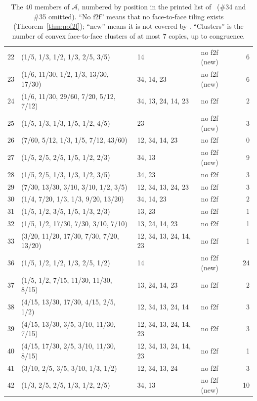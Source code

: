 \documentclass[11pt]{amsart}
\theoremstyle{definition}
\newcommand{\cA}{\mathscr{A}}
\begin{document}
\begin{table}[p]
\begin{tabular}{@{}rlllr@{}}
22 & (1/5, 1/3, 1/2, 1/3, 2/5, 3/5) & 14 & no f2f (new) & 6 \\
23 & (1/6, 11/30, 1/2, 1/3, 13/30, 17/30) & 34, 14, 23 & no f2f (new) & 6 \\
24 & (1/6, 11/30, 29/60, 7/20, 5/12, 7/12) & 34, 13, 24, 14, 23 & no f2f & 2 \\
25 & (1/5, 1/3, 1/3, 1/5, 1/2, 4/5) & 23 & no f2f (new) & 3 \\
26 & (7/60, 5/12, 1/3, 1/5, 7/12, 43/60) & 12, 34, 14, 23 & no f2f & 0 \\
27 & (1/5, 2/5, 2/5, 1/5, 1/2, 2/3) & 34, 13 & no f2f (new) & 9 \\
28 & (1/5, 2/5, 1/3, 1/3, 1/2, 3/5) & 34, 23 & no f2f & 3 \\
29 & (7/30, 13/30, 3/10, 3/10, 1/2, 3/5) & 12, 34, 13, 24, 23 & no f2f & 3 \\
30 & (1/4, 7/20, 1/3, 1/3, 9/20, 13/20) & 34, 14, 23 & no f2f & 2 \\
31 & (1/5, 1/2, 3/5, 1/5, 1/3, 2/3) & 13, 23 & no f2f & 1 \\
32 & (1/5, 1/2, 17/30, 7/30, 3/10, 7/10) & 13, 24, 14, 23 & no f2f & 1 \\
33 & (3/20, 11/20, 17/30, 7/30, 7/20, 13/20) & 12, 34, 13, 24, 14, 23 & no f2f & 1 \\
36 & (1/5, 1/2, 1/2, 1/3, 2/5, 1/2) & 14 & no f2f (new) & 24 \\
37 & (1/5, 1/2, 7/15, 11/30, 11/30, 8/15) & 13, 24, 14, 23 & no f2f & 2 \\
38 & (4/15, 13/30, 17/30, 4/15, 2/5, 1/2) & 12, 34, 13, 24, 14 & no f2f & 3 \\
39 & (4/15, 13/30, 3/5, 3/10, 11/30, 7/15) & 12, 34, 13, 24, 14, 23 & no f2f & 3 \\
40 & (4/15, 17/30, 2/5, 3/10, 11/30, 8/15) & 12, 34, 13, 24, 14, 23 & no f2f & 1 \\
41 & (3/10, 2/5, 3/5, 3/10, 1/3, 1/2) & 12, 34, 13, 24 & no f2f & 3 \\
42 & (1/3, 2/5, 2/5, 1/3, 1/2, 2/5) & 34, 13 & no f2f (new) & 10 \\
\bottomrule
\end{tabular}
\medskip
\caption{The $40$ members of $\cA$, numbered by position in the printed list of~\cite{CS} (\#34 and \#35 omitted).
``No f2f'' means that no face-to-face tiling exists (Theorem~\ref{thm:nof2f}); ``new'' means it is not covered by
\cite[Prop.~2.7]{CS}. ``Clusters'' is the number of convex face-to-face clusters of at most $7$ copies, up to
congruence.}\label{tab:A}
\end{table}
\end{document}

